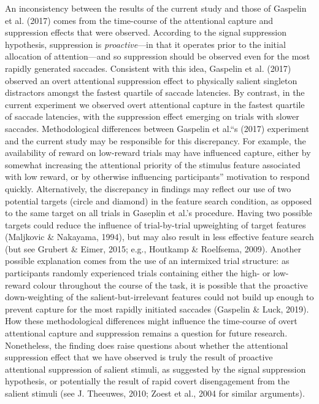 \documentclass[jou, a4paper, noextraspace,floatsintext]{apa6}
\theoremstyle{definition}
\theoremstyle{definition}
\theoremstyle{definition}
\theoremstyle{remark}
\begin{document}
An inconsistency between the results of the current study and those of
Gaspelin et al. (2017) comes from the time-course of the attentional
capture and suppression effects that were observed. According to the
signal suppression hypothesis, suppression is \emph{proactive}---in that
it operates prior to the initial allocation of attention---and so
suppression should be observed even for the most rapidly generated
saccades. Consistent with this idea, Gaspelin et al. (2017) observed an
overt attentional suppression effect to physically salient singleton
distractors amongst the fastest quartile of saccade latencies. By
contrast, in the current experiment we observed overt attentional
capture in the fastest quartile of saccade latencies, with the
suppression effect emerging on trials with slower saccades.
Methodological differences between Gaspelin et al.\enquote{s (2017)
experiment and the current study may be responsible for this
discrepancy. For example, the availability of reward on low-reward
trials may have influenced capture, either by somewhat increasing the
attentional priority of the stimulus feature associated with low reward,
or by otherwise influencing participants} motivation to respond quickly.
Alternatively, the discrepancy in findings may reflect our use of two
potential targets (circle and diamond) in the feature search condition,
as opposed to the same target on all trials in Gaseplin et al.'s
procedure. Having two possible targets could reduce the influence of
trial-by-trial upweighting of target features (Maljkovic \& Nakayama,
1994), but may also result in less effective feature search (but see
Grubert \& Eimer, 2015; e.g., Houtkamp \& Roelfsema, 2009). Another
possible explanation comes from the use of an intermixed trial
structure: as participants randomly experienced trials containing either
the high- or low-reward colour throughout the course of the task, it is
possible that the proactive down-weighting of the salient-but-irrelevant
features could not build up enough to prevent capture for the most
rapidly initiated saccades (Gaspelin \& Luck, 2019). How these
methodological differences might influence the time-course of overt
attentional capture and suppression remains a question for future
research. Nonetheless, the finding does raise questions about whether
the attentional suppression effect that we have observed is truly the
result of proactive attentional suppression of salient stimuli, as
suggested by the signal suppression hypothesis, or potentially the
result of rapid covert disengagement from the salient stimuli (see J.
Theeuwes, 2010; Zoest et al., 2004 for similar arguments).
\end{document}
